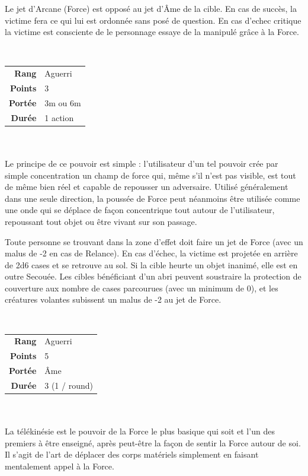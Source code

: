 \begin{description}[align=left]
		Le jet d'Arcane (Force) est opposé au jet d'\^Ame de la cible. En cas de succès, la victime fera ce qui lui est ordonnée sans posé de question. En cas d'echec critique la victime est consciente de le personnage essaye de la manipulé grâce à la Force.
        \\

    \item [Poussée de Force] ~ \\

        \begin{tabular}{ r l }
            \textbf{Rang}    & Aguerri \\
            \textbf{Points}  & 3 \\
            \textbf{Portée}  & 3m ou 6m \\
            \textbf{Durée}   & 1 action \\
        \end{tabular}
        \\ \\
        Le principe de ce pouvoir est simple : l'utilisateur d'un tel pouvoir crée par simple concentration un champ de force qui, même s'il n'est pas visible, est tout de même bien réel et capable de repousser un adversaire. Utilisé généralement dans une seule direction, la poussée de Force peut néanmoins être utilisée comme une onde qui se déplace de façon concentrique tout autour de l'utilisateur, repoussant tout objet ou être vivant sur son passage. 

        Toute personne se trouvant dans la zone d’effet doit faire un jet de Force (avec un malus de -2 en cas de Relance). En cas d’échec, la victime est projetée en arrière de 2d6 cases et se retrouve au sol. Si la cible heurte un objet inanimé, elle est en outre Secouée. Les cibles bénéficiant d’un abri peuvent soustraire la protection de couverture aux nombre de cases parcourues (avec un minimum de 0), et les créatures volantes subissent un malus de -2 au jet de Force.
        \\

    \item [Télékinésie] ~ \\

        \begin{tabular}{ r l }
            \textbf{Rang}    & Aguerri \\
            \textbf{Points}  & 5 \\
            \textbf{Portée}  & \^Ame \\
            \textbf{Durée}   & 3 (1 / round) \\
        \end{tabular}
        \\ \\
        La télékinésie est le pouvoir de la Force le plus basique qui soit et l'un des premiers à être enseigné, après peut-être la façon de sentir la Force autour de soi. Il s'agit de l'art de déplacer des corps matériels simplement en faisant mentalement appel à la Force.


\end{description}
